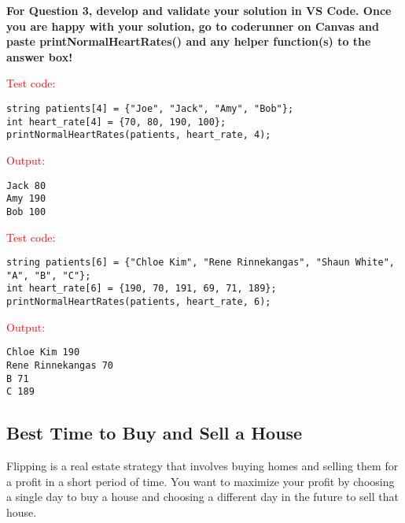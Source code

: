 \textbf{For Question 3, develop and validate your solution in VS Code. Once you are happy with your solution, go to coderunner on Canvas and paste printNormalHeartRates() and any helper function(s) to the answer box!} 
\begin{sample}
\textcolor{red}{Test code:}
\begin{verbatim}
string patients[4] = {"Joe", "Jack", "Amy", "Bob"};
int heart_rate[4] = {70, 80, 190, 100};
printNormalHeartRates(patients, heart_rate, 4);
\end{verbatim}
\textcolor{red}{Output:}
\begin{verbatim}
Jack 80
Amy 190
Bob 100
\end{verbatim}
\end{sample}

\begin{sample}
\textcolor{red}{Test code:}
\begin{verbatim}
string patients[6] = {"Chloe Kim", "Rene Rinnekangas", "Shaun White", "A", "B", "C"};
int heart_rate[6] = {190, 70, 191, 69, 71, 189};
printNormalHeartRates(patients, heart_rate, 6);
\end{verbatim}
\textcolor{red}{Output:}
\begin{verbatim}
Chloe Kim 190
Rene Rinnekangas 70
B 71
C 189
\end{verbatim}
\end{sample}

\subsection{Best Time to Buy and Sell a House}

Flipping is a real estate strategy that involves buying homes and selling them for a profit in a short period of time. You want to maximize your profit by choosing a single day to buy a house and choosing a different day in the future to sell that house.


